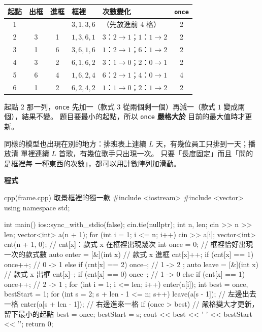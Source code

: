 \begin{center}
\begin{tabular}{cccll c}
\toprule
起點 & 出框 & 進框 & 框裡 & 次數變化 & \texttt{once} \\
\midrule
1 & & & $3, 1, 3, 6$ & （先放進前 $4$ 格） & 2 \\
2 & 3 & 1 & $1, 3, 6, 1$ & $3$：$2 \to 1$；$1$：$1 \to 2$ & 2 \\
3 & 1 & 6 & $3, 6, 1, 6$ & $1$：$2 \to 1$；$6$：$1 \to 2$ & 2 \\
4 & 3 & 2 & $6, 1, 6, 2$ & $3$：$1 \to 0$；$2$：$0 \to 1$ & 2 \\
5 & 6 & 4 & $1, 6, 2, 4$ & $6$：$2 \to 1$；$4$：$0 \to 1$ & 4 \\
6 & 1 & 2 & $6, 2, 4, 2$ & $1$：$1 \to 0$；$2$：$1 \to 2$ & 2 \\
\bottomrule
\end{tabular}
\end{center}

起點 $2$ 那一列，\texttt{once} 先加一（款式 $3$ 從兩個剩一個）再減一（款式 $1$
變成兩個），結果不變。 題目要最小的起點，所以 \texttt{once} \textbf{嚴格大於}
目前的最大值時才更新。

同樣的模型也出現在別的地方：排班表上連續 $L$ 天，有幾位員工只排到一天；播放清
單裡連續 $L$ 首歌，有幾位歌手只出現一次。 只要「長度固定」而且「問的是框裡每
一種東西的次數」，都可以用計數陣列加滑動。

\textbf{程式}

\begin{example}[label=ex:ps-frame]{cpp}{(frame.cpp) 取景框裡的獨一款}
#include <iostream>
#include <vector>
using namespace std;

int main() {
    ios::sync_with_stdio(false);
    cin.tie(nullptr);
    int n, len;
    cin >> n >> len;
    vector<int> a(n + 1);
    for (int i = 1; i <= n; i++) {
        cin >> a[i];
    }
    vector<int> cnt(n + 1, 0);    // cnt[x]：款式 x 在框裡出現幾次
    int once = 0;                 // 框裡恰好出現一次的款式數
    auto enter = [&](int x) {     // 款式 x 進框
        cnt[x]++;
        if (cnt[x] == 1) {
            once++;               // 0 -> 1
        } else if (cnt[x] == 2) {
            once--;               // 1 -> 2
        }
    };
    auto leave = [&](int x) {     // 款式 x 出框
        cnt[x]--;
        if (cnt[x] == 0) {
            once--;               // 1 -> 0
        } else if (cnt[x] == 1) {
            once++;               // 2 -> 1
        }
    };
    for (int i = 1; i <= len; i++) {
        enter(a[i]);
    }
    int best = once, bestStart = 1;
    for (int s = 2; s + len - 1 <= n; s++) {
        leave(a[s - 1]);          // 左邊出去一格
        enter(a[s + len - 1]);    // 右邊進來一格
        if (once > best) {        // 嚴格變大才更新，留下最小的起點
            best = once;
            bestStart = s;
        }
    }
    cout << best << ' ' << bestStart << '\n';
    return 0;
}
\end{example}

